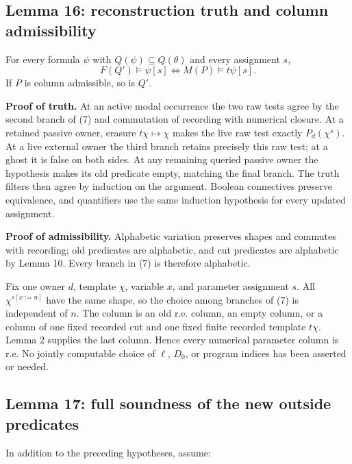 \documentclass[
  11pt,
  letterpaper,
]{article}
\begin{document}
\subsection{Lemma 16: reconstruction truth and column
admissibility}\label{lemma-16-reconstruction-truth-and-column-admissibility}

For every formula \(\psi\) with \(Q(\psi)\subseteq Q(\theta)\) and every
assignment \(s\), \[
F(Q')\models\psi[s]\iff M(P)\models t\psi[s].
\tag{8}
\] If \(P\) is column admissible, so is \(Q'\).

\textbf{Proof of truth.} At an active modal occurrence the two raw tests
agree by the second branch of (7) and commutation of recording with
numerical closure. At a retained passive owner, erasure
\(t\chi\mapsto\chi\) makes the live raw test exactly \(P_d(\chi^s)\). At
a live external owner the third branch retains precisely this raw test;
at a ghost it is false on both sides. At any remaining queried passive
owner the hypothesis makes its old predicate empty, matching the final
branch. The truth filters then agree by induction on the argument.
Boolean connectives preserve equivalence, and quantifiers use the same
induction hypothesis for every updated assignment.

\textbf{Proof of admissibility.} Alphabetic variation preserves shapes
and commutes with recording; old predicates are alphabetic, and cut
predicates are alphabetic by Lemma 10. Every branch in (7) is therefore
alphabetic.

Fix one owner \(d\), template \(\chi\), variable \(x\), and parameter
assignment \(s\). All \(\chi^{s[x:=n]}\) have the same shape, so the
choice among branches of (7) is independent of \(n\). The column is an
old r.e. column, an empty column, or a column of one fixed recorded cut
and one fixed finite recorded template \(t\chi\). Lemma 2 supplies the
last column. Hence every numerical parameter column is r.e. No jointly
computable choice of \(\ell\), \(D_0\), or program indices has been
asserted or needed.

\subsection{Lemma 17: full soundness of the new outside
predicates}\label{lemma-17-full-soundness-of-the-new-outside-predicates}

In addition to the preceding hypotheses, assume:
\end{document}
